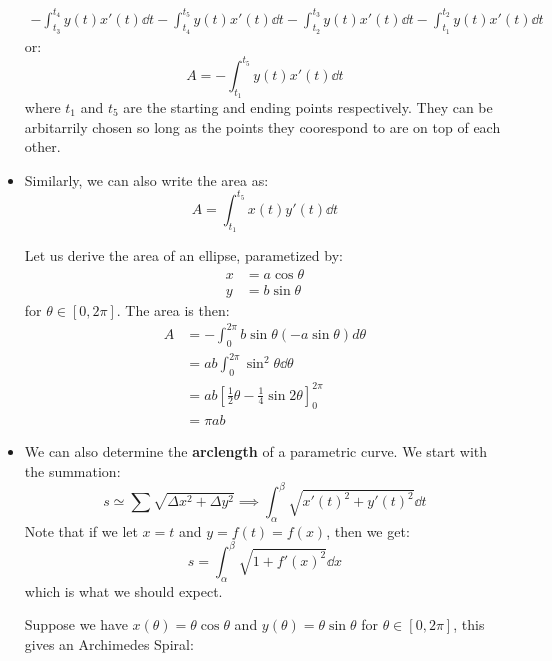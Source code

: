 \begin{itemize}
    \begin{align}
        -\int_{t_3}^{t_4}y(t)x'(t)\dd{t} - \int_{t_4}^{t_5}y(t)x'(t)\dd{t} - \int_{t_2}^{t_3}y(t)x'(t)\dd{t} - \int_{t_1}^{t_2}y(t)x'(t)\dd{t}
    \end{align}
    or:
    \begin{equation}
        A = -\int_{t_1}^{t_5} y(t)x'(t) \dd{t}
    \end{equation}
    where $t_1$ and $t_5$ are the starting and ending points respectively. They can be arbitarrily chosen so long as the points they coorespond to are on top of each other.
    \item Similarly, we can also write the area as:
    \begin{equation}
        A = \int_{t_1}^{t_5} x(t) y'(t) \dd{t}
    \end{equation}
    \begin{example}
        Let us derive the area of an ellipse, parametized by:
        \begin{align}
            x &= a\cos \theta \\ 
            y &= b\sin\theta
        \end{align}
        for $\theta \in [0,2\pi]$. The area is then:
        \begin{align}
            A &= -\int_0^{2\pi} b\sin\theta (-a\sin\theta) d\theta \\ 
            &= ab\int_0^{2\pi} \sin^2\theta \dd{\theta} \\ 
            &= ab\left[\frac{1}{2}\theta - \frac{1}{4}\sin 2\theta\right]^{2\pi}_{0} \\ 
            &= \pi ab
        \end{align}
    \end{example}
    \item We can also determine the \textbf{arclength} of a parametric curve. We start with the summation:
    \begin{equation}
        s \simeq \sum \sqrt{\Delta x^2+\Delta y^2} \implies \int_{\alpha}^{\beta}\sqrt{x'(t)^2+y'(t)^2}\dd{t}
    \end{equation}
    Note that if we let $x=t$ and $y=f(t)=f(x)$, then we get:
    \begin{equation}
        s = \int_{\alpha}^{\beta}\sqrt{1+f'(x)^2}\dd{x}
    \end{equation}
    which is what we should expect.
    \begin{example}
        Suppose we have $x(\theta) = \theta\cos\theta$ and $y(\theta)=\theta\sin\theta$ for $\theta \in [0,2\pi]$, this gives an Archimedes Spiral:

\end{example}
\end{itemize}
